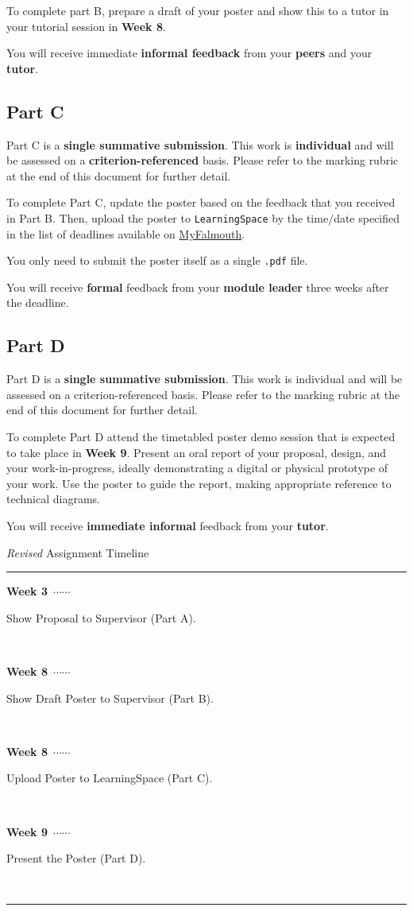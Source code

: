 \documentclass{../../fal_assignment}
\newcommand\ytl[2]{
\parbox[b]{8em}{\hfill{\color{black}\bfseries\sffamily #1}~$\cdots\cdots$~}\makebox[0pt][c]{$\bullet$}\vrule\quad \parbox[c]{4.5cm}{\vspace{7pt}\color{black}\raggedright\sffamily #2.\\[7pt]}\\[-3pt]}
\begin{document}
To complete part B, prepare a draft of your poster and show this to a tutor in your tutorial session in \textbf{Week 8}.

You will receive immediate \textbf{informal feedback} from your \textbf{peers} and your \textbf{tutor}.

\subsection*{Part C}

Part C is a \textbf{single summative submission}. This work is \textbf{individual} and will be assessed on a \textbf{criterion-referenced} basis.  Please refer to the marking rubric at the end of this document for further detail.

To complete Part C, update the poster based on the feedback that you received in Part B. Then, upload the poster to \texttt{LearningSpace} by the time/date specified in the list of deadlines available on \href{http://myfalmouth.falmouth.ac.uk}{MyFalmouth}. 

You only need to submit the poster itself as a single \texttt{.pdf} file.

You will receive \textbf{formal} feedback from your \textbf{module leader} three weeks after the deadline.

\subsection*{Part D}

Part D is a \textbf{single summative submission}. This work is individual and will be assessed on a criterion-referenced basis. Please refer to the marking rubric at the end of this document for further detail. 

To complete Part D attend the timetabled poster demo session that is expected to take place in \textbf{Week 9}. Present an oral report of your proposal, design, and your work-in-progress, ideally demonstrating a digital or physical prototype of your work. Use the poster to guide the report, making appropriate reference to technical diagrams.
	
You will receive \textbf{immediate informal} feedback from your \textbf{tutor}.
	

\begin{table}[!ht]
\caption{\textit{Revised} Assignment Timeline}
\centering
\begin{minipage}[t]{.7\linewidth}
\color{black}
\rule{\linewidth}{1pt}
\ytl{Week 3}{Show Proposal to Supervisor (Part A)}
\ytl{Week 8}{Show Draft Poster to Supervisor (Part B)}
\ytl{Week 8}{Upload Poster to LearningSpace (Part C)}
\ytl{Week 9}{Present the Poster (Part D)}
\bigskip
\rule{\linewidth}{1pt}%
\end{minipage}%
\end{table}
\end{document}
